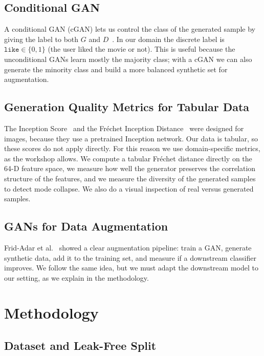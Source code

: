 \documentclass[10pt,twocolumn]{article}
\begin{document}
\subsection{Conditional GAN}

A conditional GAN (cGAN) lets us control the class of the generated sample by giving the label
to both $G$ and $D$~\cite{isola2016}. In our domain the discrete label is $\texttt{like}\in
\{0,1\}$ (the user liked the movie or not). This is useful because the unconditional GANs learn
mostly the majority class; with a cGAN we can also generate the minority class and build a more
balanced synthetic set for augmentation.

\subsection{Generation Quality Metrics for Tabular Data}

The Inception Score~\cite{salimans2016} and the Fr\'echet Inception Distance~\cite{heusel2017}
were designed for images, because they use a pretrained Inception network. Our data is tabular,
so these scores do not apply directly. For this reason we use domain-specific metrics, as the
workshop allows. We compute a tabular Fr\'echet distance directly on the 64-D feature space, we
measure how well the generator preserves the correlation structure of the features, and we
measure the diversity of the generated samples to detect mode collapse. We also do a visual
inspection of real versus generated samples.

\subsection{GANs for Data Augmentation}

Frid-Adar et al.~\cite{fridadar2018} showed a clear augmentation pipeline: train a GAN, generate
synthetic data, add it to the training set, and measure if a downstream classifier improves.
We follow the same idea, but we must adapt the downstream model to our setting, as we explain
in the methodology.

\section{Methodology}

\subsection{Dataset and Leak-Free Split}
\end{document}
